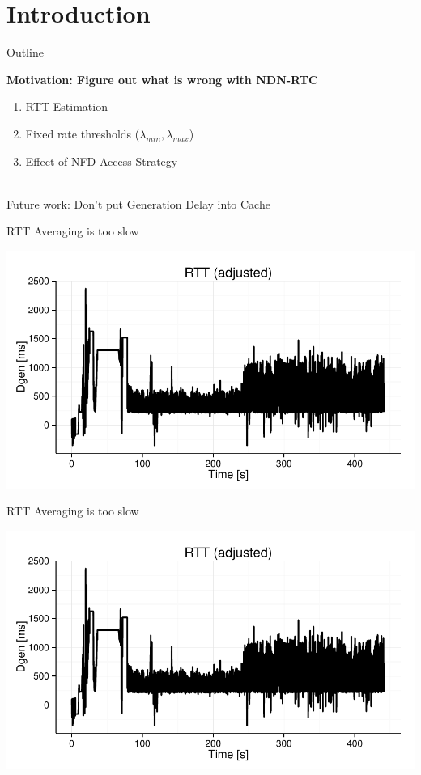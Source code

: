 \section{Introduction}

\begin{frame}{Outline}
	
	
	
	\large
\textbf{
	Motivation: Figure out what is wrong with NDN-RTC
}
~\\
	\begin{enumerate}
		\item RTT Estimation
		\item Fixed rate thresholds ($\lambda_{min}, \lambda_{max}$)
		\item Effect of NFD Access Strategy
	\end{enumerate}
	~\\
	
	Future work: Don't put Generation Delay into Cache
	
\end{frame}


\begin{frame}{RTT Averaging is too slow}
	
	\includegraphics[width=\linewidth,page=1]{images/test8_1.pdf}
	
\end{frame}

\begin{frame}{RTT Averaging is too slow}
	
	\includegraphics[width=\linewidth,page=2]{images/test8_1.pdf}
	
\end{frame}

